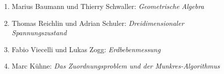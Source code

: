 \documentclass[handout]{beamer}
\begin{document}
\begin{frame}
\begin{columns}[t,onlytextwidth]
\begin{column}{0.65\textwidth}
\begin{description}
\begin{enumerate}
\item Marius Baumann und Thierry Schwaller: {\em Geometrische Algebra}
\item Thomas Reichlin und Adrian Schuler: {\em Dreidimensionaler Spannungszustand}
\item Fabio Viecelli und Lukas Zogg: {\em Erdbebenmessung}
\item Marc Kühne: {\em Das Zuordnungsproblem und der Munkres-Algorithmus}
\end{enumerate}
\end{description}
\end{column}
\begin{column}{0.01\textwidth}
\end{column}
\end{columns}
\end{frame}
\end{document}
